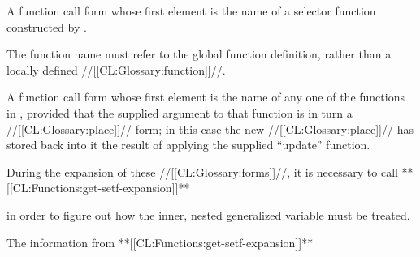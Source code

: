 A function call form whose first element is the name of
a selector function constructed by .


The function name must refer to the global function definition,
rather than a locally defined //[[CL:Glossary:function]]//.

































\itemitem{\bull}

A function call form whose first element is the name of
any one of the functions in \thenextfigure, 
provided that the supplied argument
to that function is in turn a //[[CL:Glossary:place]]// form;
in this case the new //[[CL:Glossary:place]]// has stored back into it the
result of applying the supplied ``update'' function.











During the  expansion of these //[[CL:Glossary:forms]]//, it is necessary to call 
**[[CL:Functions:get-setf-expansion]]** 

in order to figure out how the inner, nested generalized variable must be treated.  
 
The information from
**[[CL:Functions:get-setf-expansion]]**

